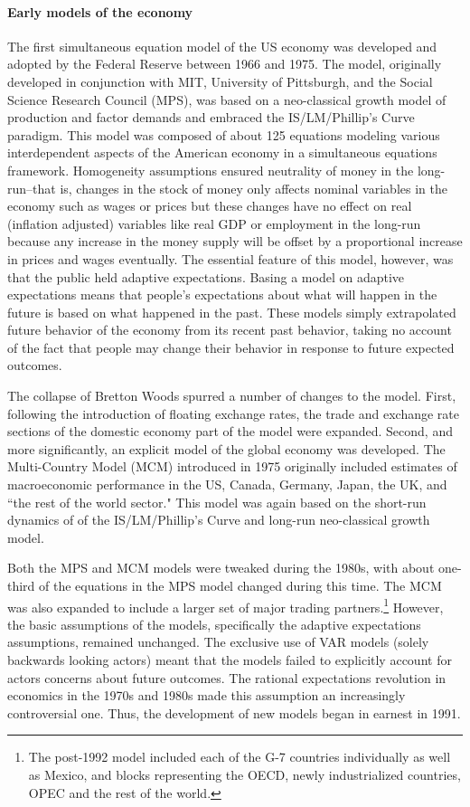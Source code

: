 \documentclass[a4paper]{article}\usepackage{graphicx, color}
\begin{document}
\paragraph{Early models of the economy}
The first simultaneous equation model of the US economy was developed and adopted by the Federal Reserve between 1966 and 1975. The model, originally developed in conjunction with MIT, University of Pittsburgh, and the Social Science Research Council (MPS), was based on a neo-classical growth model of production and factor demands and embraced the IS/LM/Phillip's Curve paradigm. This model was composed of about 125 equations modeling various interdependent aspects of the American economy in a simultaneous equations framework. Homogeneity assumptions ensured neutrality of money in the long-run--that is, changes in the stock of money only affects nominal variables in the economy such as wages or prices but these changes have no effect on real (inflation adjusted) variables like real GDP or employment in the long-run because any increase in the money supply will be offset by a proportional increase in prices and wages eventually. The essential feature of this model, however, was that the public held adaptive expectations. Basing a model on adaptive expectations means that people's expectations about what will happen in the future is based on what happened in the past. These models simply extrapolated future behavior of the economy from its recent past behavior, taking no account of the fact that people may change their behavior in response to future expected outcomes.

The collapse of Bretton Woods spurred a number of changes to the model. First, following the introduction of floating exchange rates, the trade and exchange rate sections of the domestic economy part of the model were expanded. Second, and more significantly, an explicit model of the global economy was developed. The Multi-Country Model (MCM) introduced in 1975 originally included estimates of macroeconomic performance in the US, Canada, Germany, Japan, the UK, and ``the rest of the world sector." This model was again based on the short-run dynamics of of the IS/LM/Phillip's Curve and long-run neo-classical growth model.

Both the MPS and MCM models were tweaked during the 1980s, with about one-third of the equations in the MPS model changed during this time. The MCM was also expanded to include a larger set of major trading partners.\footnote{The post-1992 model included each of the G-7 countries individually as well as Mexico, and blocks representing the OECD, newly industrialized countries, OPEC and the rest of the world.} However, the basic assumptions of the models, specifically the adaptive expectations assumptions, remained unchanged. The exclusive use of VAR models (solely backwards looking actors) meant that the models failed to explicitly account for actors concerns about future outcomes. The rational expectations revolution in economics in the 1970s and 1980s made this assumption an increasingly controversial one. Thus, the development of new models began in earnest in 1991.
 
\end{document}
